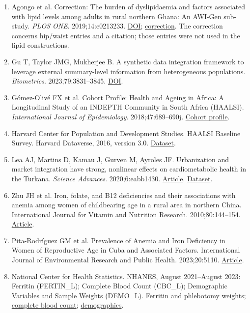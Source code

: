 \documentclass[11pt,letterpaper]{article}
\begin{document}
\begin{enumerate}[label=\arabic*.,leftmargin=2.1em,itemsep=.2em,parsep=0pt]
\item Agongo et al. Correction: The burden of dyslipidaemia and factors associated with lipid levels among adults in rural northern Ghana: An AWI-Gen sub-study. \emph{PLOS ONE}. 2019;14:e0213233. \href{https://doi.org/10.1371/journal.pone.0213233}{DOI}; \href{https://pmc.ncbi.nlm.nih.gov/articles/PMC6392312/}{correction}. The correction concerns hip/\allowbreak{}waist entries and a citation; those entries were not used in the lipid constructions.

\item Gu T, Taylor JMG, Mukherjee B. A synthetic data integration framework to leverage external summary-level information from heterogeneous populations. \emph{Biometrics}. 2023;79:3831–\allowbreak{}3845. \href{https://doi.org/10.1111/biom.13852}{DOI}.

\item Gómez-Olivé FX et al. Cohort Profile: Health and Ageing in Africa: A Longitudinal Study of an INDEPTH Community in South Africa (HAALSI). \emph{International Journal of Epidemiology}. 2018;47:689–\allowbreak{}690j. \href{https://doi.org/10.1093/ije/dyx247}{Cohort profile}.

\item Harvard Center for Population and Development Studies. HAALSI Baseline Survey. Harvard Dataverse, 2016, version 3.0. \href{https://doi.org/10.7910/DVN/F5YHML}{Dataset}.

\item Lea AJ, Martins D, Kamau J, Gurven M, Ayroles JF. Urbanization and market integration have strong, nonlinear effects on cardiometabolic health in the Turkana. \emph{Science Advances}. 2020;6:eabb1430. \href{https://doi.org/10.1126/sciadv.abb1430}{Article}. \href{https://doi.org/10.5061/dryad.2z34tmpjk}{Dataset}.

\item Zhu JH et al. Iron, folate, and B12 deficiencies and their associations with anemia among women of childbearing age in a rural area in northern China. International Journal for Vitamin and Nutrition Research. 2010;80:144–\allowbreak{}154. \href{https://doi.org/10.1024/0300-9831/a000014}{Article}.

\item Pita-Rodríguez GM et al. Prevalence of Anemia and Iron Deficiency in Women of Reproductive Age in Cuba and Associated Factors. International Journal of Environmental Research and Public Health. 2023;20:5110. \href{https://doi.org/10.3390/ijerph20065110}{Article}.

\item National Center for Health Statistics. NHANES, August 2021–\allowbreak{}August 2023: Ferritin (FERTIN\_L); Complete Blood Count (CBC\_L); Demographic Variables and Sample Weights (DEMO\_L). \href{https://wwwn.cdc.gov/Nchs/Data/Nhanes/Public/2021/DataFiles/FERTIN\_L.htm}{Ferritin and phlebotomy weights}; \href{https://wwwn.cdc.gov/Nchs/Data/Nhanes/Public/2021/DataFiles/CBC\_L.htm}{complete blood count}; \href{https://wwwn.cdc.gov/Nchs/Data/Nhanes/Public/2021/DataFiles/DEMO\_L.htm}{demographics}.

\end{enumerate}
\end{document}
